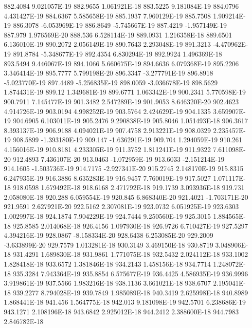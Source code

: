 882.4084  9.021057E-19
882.9655  1.061921E-18
883.5225  9.181084E-19
884.0796  4.431427E-19
884.6367  5.585658E-19
885.1937  7.960129E-19
885.7508  1.909214E-19
886.3078  -6.053969E-19
886.8649  -5.745667E-19
887.4219  -1.957149E-19
887.979  1.976569E-20
888.536  6.528114E-19
889.0931  1.216358E-18
889.6501  6.136010E-19
890.2072  2.056149E-19
890.7643  2.293048E-19
891.3213  -4.470962E-19
891.8784  -5.348677E-19
892.4354  6.830294E-19
892.9924  1.496369E-18
893.5494  9.446067E-19
894.1066  5.660675E-19
894.6636  6.079368E-19
895.2206  3.346414E-19
895.7777  5.799198E-20
896.3347  -3.277791E-19
896.8918  -5.023770E-19
897.4489  -5.256835E-19
898.0059  -3.036678E-19
898.5629  1.874431E-19
899.12  1.349681E-19
899.6771  1.063342E-19
900.2341  5.770598E-19
900.7911  7.145477E-19
901.3482  2.547289E-19
901.9053  8.646320E-20
902.4623  4.914726E-19
903.0194  4.998252E-19
903.5764  2.424629E-19
904.1335  3.659907E-19
904.6905  6.103011E-19
905.2476  9.290838E-19
905.8046  1.051493E-18
906.3617  8.393137E-19
906.9188  4.094021E-19
907.4758  2.913221E-19
908.0329  2.235457E-19
908.5899  -1.393180E-19
909.147  -1.636291E-19
909.704  1.294059E-19
910.261  4.156016E-19
910.8181  4.233305E-19
911.3752  1.811241E-19
911.9322  7.611098E-20
912.4893  7.436107E-20
913.0463  -1.072959E-19
913.6033  -2.151214E-19
914.1605  -1.503736E-19
914.7175  -2.927341E-20
915.2745  2.148170E-19
915.8315  6.247935E-19
916.3886  8.635283E-19
916.9457  7.760019E-19
917.5027  1.071117E-18
918.0598  1.679492E-18
918.6168  2.471792E-18
919.1739  3.093936E-18
919.731  2.058080E-18
920.288  6.059554E-19
920.845  6.868340E-20
921.4021  -1.703171E-20
921.9591  2.627921E-20
922.5162  2.307081E-19
923.0732  6.051925E-19
923.6303  1.002997E-18
924.1874  7.904229E-19
924.7444  9.250560E-19
925.3015  1.884565E-18
925.8585  2.014068E-18
926.4156  1.097930E-18
926.9726  6.710427E-19
927.5297  4.394216E-19
928.0867  -8.158334E-20
928.6438  6.253085E-20
929.2009  -3.633899E-20
929.7579  1.013281E-18
930.3149  3.469150E-18
930.8719  3.048906E-18
931.4291  1.689830E-18
931.9861  1.771075E-18
932.5432  2.024112E-18
933.1002  1.828418E-18
933.6572  1.381846E-18
934.2143  1.458156E-18
934.7714  1.248072E-18
935.3284  7.943364E-19
935.8854  6.575677E-19
936.4425  4.586935E-19
936.9996  3.919861E-19
937.5566  1.983216E-18
938.1136  3.661021E-18
938.6707  2.195041E-18
939.2277  8.794028E-19
939.7849  1.985089E-18
940.3419  2.625998E-18
940.8989  1.868441E-18
941.456  1.564775E-18
942.013  9.181098E-19
942.5701  6.238686E-19
943.1271  2.108196E-18
943.6842  2.925012E-18
944.2412  2.388600E-18
944.7983  2.846782E-18
